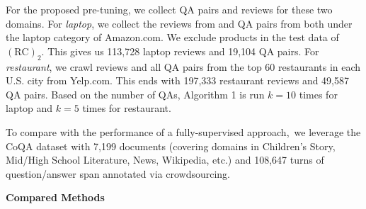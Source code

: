 \begin{table}
    \caption{Statistics of $(\text{RC})_2$ Datasets.}
    \centering
\label{chap6:tbl:rcrc}
\vspace{-5mm}
\end{table}

For the proposed pre-tuning, we collect QA pairs and reviews for these two domains.
For \emph{laptop}, we collect the reviews from \cite{he2016ups} and QA pairs from \cite{Xu2018pro} both under the laptop category of Amazon.com. We exclude products in the test data of $(\text{RC})_2$.
This gives us 113,728 laptop reviews and 19,104 QA pairs. 
For \emph{restaurant}, we crawl reviews and all QA pairs from the top 60 restaurants in each U.S. city from Yelp.com.
This ends with 197,333 restaurant reviews and 49,587 QA pairs. Based on the number of QAs, Algorithm 1 is run $k=10$ times for laptop and $k=5$ times for restaurant.

To compare with the performance of a fully-supervised approach,~we leverage the CoQA dataset with 7,199 documents (covering domains in Children’s Story, Mid/High School Literature, News, Wikipedia, etc.) and 108,647 turns of question/answer span annotated via crowdsourcing.

\textbf{Compared Methods}

